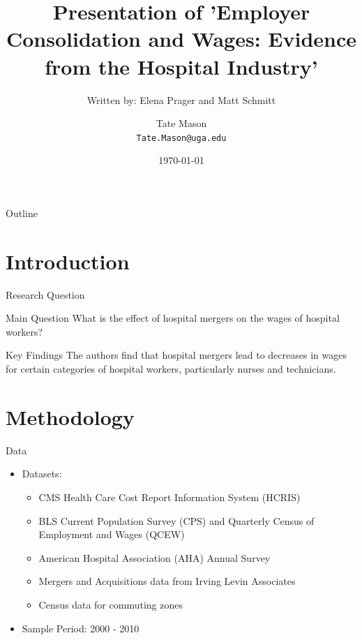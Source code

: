 \documentclass{beamer}
\title[]{Presentation of 'Employer Consolidation and Wages: Evidence from the Hospital Industry'}
\subtitle{Written by: Elena Prager and Matt Schmitt}
\author[Your Name]{Tate Mason\\ \smallskip \texttt{Tate.Mason@uga.edu}}
\date{\today} %
\begin{document}
\begin{frame}
  \titlepage
\end{frame}

\begin{frame}{Outline}
  \tableofcontents
\end{frame}

\section{Introduction}

\begin{frame}{Research Question}
  \begin{block}{Main Question}
    What is the effect of hospital mergers on the wages of hospital workers?
  \end{block}
  \pause
  \begin{exampleblock}{Key Findings}
    The authors find that hospital mergers lead to decreases in wages for certain categories of hospital workers, particularly nurses and technicians.
  \end{exampleblock}
\end{frame}

\section{Methodology}

\begin{frame}{Data}
  \begin{itemize}
    \item Datasets:
    \begin{itemize}
      \item CMS Health Care Cost Report Information System (HCRIS)
      \item BLS Current Population Survey (CPS) and Quarterly Census of Employment and Wages (QCEW)
      \item American Hospital Association (AHA) Annual Survey
      \item Mergers and Acquisitions data from Irving Levin Associates
      \item Census data for commuting zones
    \end{itemize}
    \item Sample Period: 2000 - 2010 
  \end{itemize}
\end{frame}
\end{document}
